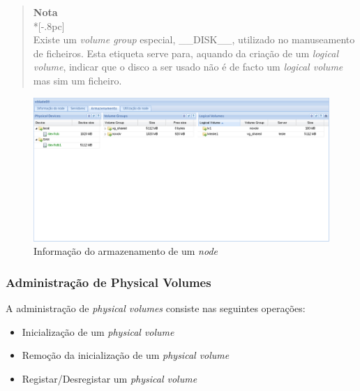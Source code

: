 \begin{quote}
	{\large \bf Nota} \\*[-.8pc]
	\underline{\hspace{6in}} \\
	Existe um \emph{volume group} especial, \_\_DISK\_\_, utilizado no manuseamento de ficheiros. Esta etiqueta serve para, aquando da criação de um \emph{logical volume}, indicar que o disco a ser usado não é de facto um \emph{logical volume} mas sim um ficheiro.
\end{quote}


\begin{figure}[H]
	\begin{center}
	\includegraphics[scale=0.45]{screenshots/node_storage.png}
	\caption{Informação do armazenamento de um \emph{node}}
	\label{fig:inicial}
	\end{center}
\end{figure}


\subsubsection{Administração de Physical Volumes}
A administração de \emph{physical volumes} consiste nas seguintes operações:
\begin{itemize}
	\item Inicialização de um \emph{physical volume}
    \item Remoção da inicialização de um \emph{physical volume}
    \item Registar/Desregistar um \emph{physical volume}
\end{itemize}

